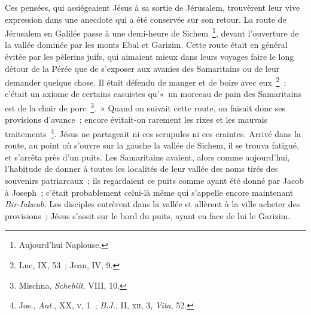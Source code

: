 \documentclass[french,twoside]{book} %
\begin{document}
Ces pensées, qui assiégeaient Jésus à sa sortie de Jérusalem, trouvèrent leur vive expression dans une anecdote qui a été conservée sur son retour. La route de Jérusalem en Galilée passe à une demi-heure de Sichem \footnote{Aujourd’hui Naplouse.}, devant l’ouverture de la vallée dominée par les monts Ebal et Garizim. Cette route était en général évitée par les pèlerins juifs, qui aimaient mieux dans leurs voyages faire le long détour de la Pérée que de s’exposer aux avanies des Samaritains ou de leur demander quelque chose. Il était défendu de manger et de boire avec eux \footnote{Luc, IX, 53 ; Jean, IV, 9.} ; c’était un axiome de certains casuistes qu’« un morceau de pain des Samaritains est de la chair de porc \footnote{ Mischna, {\itshape Schebiit}, VIII, 10.}. » Quand on suivait cette route, on faisait donc ses provisions d’avance ; encore évitait-on rarement les rixes et les mauvais traitements \footnote{ Jos., {\itshape Ant.}, XX, \textsc{v}, 1 ; {\itshape B.J.}, II, \textsc{xii}, 3, {\itshape Vita}, 52.}. Jésus ne partageait ni ces scrupules ni ces craintes. Arrivé dans la route, au point où s’ouvre sur la gauche la vallée de Sichem, il se trouva fatigué, et s’arrêta près d’un puits. Les Samaritains avaient, alors comme aujourd’hui, l’habitude de donner à toutes les localités de leur vallée des noms tirés des souvenirs patriarcaux ; ils regardaient ce puits comme ayant été donné par Jacob à Joseph ; c’était probablement celui-là même qui s’appelle encore maintenant {\itshape Bir-Iakoub.} Les disciples entrèrent dans la vallée et allèrent à la ville acheter des provisions ; Jésus s’assit sur le bord du puits, ayant en face de lui le Garizim.\par
\end{document}
